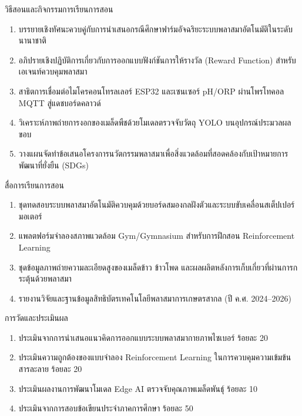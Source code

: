\newpage

\begin{planbox}{วิธีสอนและกิจกรรมการเรียนการสอน}
\begin{enumerate}
    \item บรรยายเชิงทัศนะควบคู่กับการนำเสนอกรณีศึกษาฟาร์มอัจฉริยะระบบพลาสมาอัตโนมัติในระดับนานาชาติ
    \item อภิปรายเชิงปฏิบัติการเกี่ยวกับการออกแบบฟังก์ชันการให้รางวัล (Reward Function) สำหรับเอเจนท์ควบคุมพลาสมา
    \item สาธิตการเชื่อมต่อไมโครคอนโทรลเลอร์ ESP32 และเซนเซอร์ pH/ORP ผ่านโพรโทคอล MQTT สู่แดชบอร์ดคลาวด์
    \item วิเคราะห์ภาพถ่ายการงอกของเมล็ดพืชด้วยโมเดลตรวจจับวัตถุ YOLO บนอุปกรณ์ประมวลผลขอบ
    \item วางแผนจัดทำข้อเสนอโครงการนวัตกรรมพลาสมาเพื่อสิ่งแวดล้อมที่สอดคล้องกับเป้าหมายการพัฒนาที่ยั่งยืน (SDGs)
\end{enumerate}
\end{planbox}

\begin{planbox}{สื่อการเรียนการสอน}
\begin{enumerate}
    \item ชุดทดสอบระบบพลาสมาอัตโนมัติควบคุมด้วยบอร์ดสมองกลฝังตัวและระบบขับเคลื่อนสเต็ปเปอร์มอเตอร์
    \item แพลตฟอร์มจำลองสภาพแวดล้อม Gym/Gymnasium สำหรับการฝึกสอน Reinforcement Learning
    \item ชุดข้อมูลภาพถ่ายความละเอียดสูงของเมล็ดข้าว ข้าวโพด และผลผลิตหลังการเก็บเกี่ยวที่ผ่านการกระตุ้นด้วยพลาสมา
    \item รายงานวิจัยและฐานข้อมูลสิทธิบัตรเทคโนโลยีพลาสมาการเกษตรสากล (ปี ค.ศ. 2024--2026)
\end{enumerate}
\end{planbox}

\begin{planbox}{การวัดและประเมินผล}
\begin{enumerate}
    \item ประเมินจากการนำเสนอแนวคิดการออกแบบระบบพลาสมากายภาพไซเบอร์ ร้อยละ 20
    \item ประเมินความถูกต้องของแบบจำลอง Reinforcement Learning ในการควบคุมความเข้มข้นสารละลาย ร้อยละ 20
    \item ประเมินผลงานการพัฒนาโมเดล Edge AI ตรวจจับคุณภาพเมล็ดพันธุ์ ร้อยละ 10
    \item ประเมินจากการสอบข้อเขียนประจำภาคการศึกษา ร้อยละ 50
\end{enumerate}
\end{planbox}

